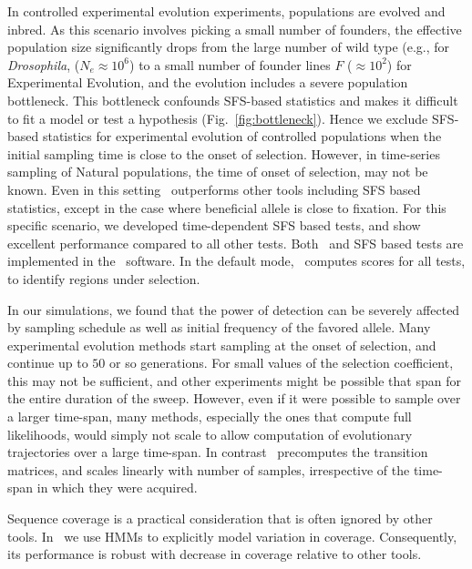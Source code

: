 \documentclass[11pt]{article}
\def\comale{\text{{\sc Comale}}}
\begin{document}
In controlled experimental evolution experiments, populations are
evolved and inbred. As this scenario involves picking a small number
of founders, the effective population size significantly drops from
the large number of wild type (e.g., for \emph{Drosophila},
($N_e\approx10^6$) to a small number of founder lines $F$ ($\approx
10^2$) for Experimental Evolution, and the evolution includes a severe
population bottleneck. This bottleneck confounds SFS-based statistics
and makes it difficult to fit a model or test a hypothesis
(Fig.~\ref{fig:bottleneck}).  Hence we exclude SFS-based statistics
for experimental evolution of controlled populations when the initial
sampling time is close to the onset of selection. However, in
time-series sampling of Natural populations, the time of onset of
selection, may not be known. Even in this setting \comale\ outperforms
other tools including SFS based statistics, except in the case where
beneficial allele is close to fixation. For this specific scenario, we
developed time-dependent SFS based tests, and show excellent
performance compared to all other tests. Both \comale\ and SFS based
tests are implemented in the \comale\ software. In the default mode,
\comale\ computes scores for all tests, to identify regions under
selection.
	

In our simulations, we found that the power of detection can be
severely affected by sampling schedule as well as initial frequency of
the favored allele. Many experimental evolution methods start sampling
at the onset of selection, and continue up to $50$ or so
generations. For small values of the selection coefficient, this may
not be sufficient, and other experiments might be possible that span
for the entire duration of the sweep. However, even if it were
possible to sample over a larger time-span, many methods, especially
the ones that compute full likelihoods, would simply not scale to
allow computation of evolutionary trajectories over a large
time-span. In contrast \comale\ precomputes the transition matrices,
and scales linearly with number of samples, irrespective of the
time-span in which they were acquired.

Sequence coverage is a practical consideration that is often ignored
by other tools.  In \comale\ we use HMMs to explicitly model variation
in coverage. Consequently, its performance is robust with decrease in
coverage relative to other tools.
\end{document}

